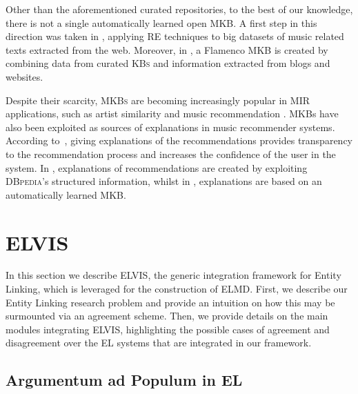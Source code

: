 Other than the aforementioned curated repositories, to the best of our knowledge, there is not a single automatically learned open \textsc{MKB}. A first step in this direction was taken in \cite{Sordo2015,Oramas2014}, applying \textsc{RE} techniques to big datasets of music related texts extracted from the web. Moreover, in \cite{Oramas2015b}, a Flamenco \textsc{MKB} is created by combining data from curated \textsc{KBs} and information extracted from blogs and websites.

Despite their scarcity, \textsc{MKBs} are becoming increasingly popular in MIR applications, such as artist similarity and music recommendation \cite{Celma2008,Oramas2015a,Leal2012,Ostuni2015}. 
MKBs have also been exploited as sources of explanations in music recommender systems. According to~\cite{CelmaandHerrera2008}, giving explanations of the recommendations provides transparency to the recommendation process and increases the confidence of the user in the system. In \cite{Passant2010}, explanations of recommendations are created by exploiting \textsc{DBpedia}'s structured information, whilst in \cite{Sordo2015}, explanations are based on an automatically learned \textsc{MKB}. 



\section{ELVIS}
\label{sec:method}

In this section we describe \textsc{ELVIS}, the generic integration framework for Entity Linking, which is leveraged for the construction of \textsc{ELMD}. First, we describe our Entity Linking research problem and provide an intuition on how this may be surmounted via an agreement scheme. Then, we provide details on the main modules integrating \textsc{ELVIS}, highlighting the possible cases of agreement and disagreement over the EL systems that are integrated in our framework.

\subsection{Argumentum ad Populum in EL}
\label{sec:tools}

